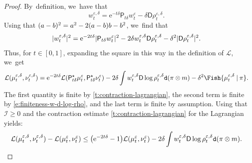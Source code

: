 \documentclass[10pt]{amsart}
\theoremstyle{definition}
\theoremstyle{remark}
\DeclarePairedDelimiter{\paren}{\lparen}{\rparen}
\DeclarePairedDelimiter{\abs}{\lvert}{\rvert}
\newcommand{\given}[1][]{%
\nonscript\:#1\vert
\allowbreak
\nonscript\:
\mathopen{}}
\begin{document}
\begin{proof}
By~definition, we~have that
\begin{equation*}
w_{t}^{\varepsilon, \delta} = \mathrm{e}^{-t\delta} \mathsf{P}_{t\delta} w_{t}^{\varepsilon} - \delta \mathsf{D} \rho^{\varepsilon,\delta}_{t}.
\end{equation*}
Using that $\paren{a-b}^{2} = a^{2} - 2(a-b)b - b^{2}$, we~find that
\begin{equation*}
\abs{w_{t}^{\varepsilon,\delta}}^{2} = \mathrm{e}^{-2t\delta} \abs{\mathsf{P}_{t\delta}w^{\varepsilon}_{t}}^{2} - 2 \delta w_{t}^{\varepsilon,\delta} \mathsf{D} \rho^{\varepsilon,\delta}_{t} - \delta^{2} \abs{\mathsf{D} \rho^{\varepsilon,\delta}_{t}}^{2}.
\end{equation*}
Thus, for $t \in [0,1]$, expanding the square in this way in the definition of $\mathcal{L}$, we~get
\begin{equation}\label{e:expansion-lagrangian}
\mathcal{L}(\mu^{\varepsilon,\delta}_{t}, \nu^{\varepsilon,\delta}_{t}) = \mathrm{e}^{-2t\delta} \mathcal{L}(\mathsf{P}_{t\delta}^{\star} \mu^{\varepsilon}_{t}, \mathsf{P}_{t\delta}^{\star}\nu^{\varepsilon}_{t}) - 2 \delta \int w_{t}^{\varepsilon, \delta} \mathsf{D} \log \rho^{\varepsilon,\delta}_{t} \mathtt{d} (\pi \otimes m) - \delta^{2} \Fish{ \mu^{\varepsilon,\delta}_{t} \given \pi }.
\end{equation}
The first quantity is finite by \cref{t:contraction-lagrangian}, the second term is finite by \cref{e:finiteness-w-d-log-rho}, and the last term is finite by assumption.
Using that $\mathcal{I} \geq 0$ and the contraction estimate \cref{t:contraction-lagrangian} for the Lagrangian yields:
\begin{equation}\label{e:difference-lagrangian}
\mathcal{L}(\mu^{\varepsilon,\delta}_{t}, \nu^{\varepsilon,\delta}_{t}) - \mathcal{L}(\mu^{\varepsilon}_{t}, \nu^{\varepsilon}_{t}) \leq \paren*{\mathrm{e}^{-2t\delta} -1} \mathcal{L}(\mu^{\varepsilon}_{t}, \nu^{\varepsilon}_{t}) - 2 \delta \int w^{\varepsilon,\delta}_{t} \mathsf{D} \log \rho^{\varepsilon,\delta}_{t} \mathtt{d} (\pi \otimes m).
\end{equation}


\end{proof}
\end{document}
